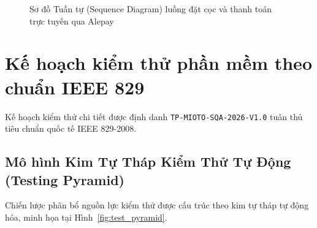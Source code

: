 \documentclass[12pt,a4paper,oneside]{report}
\begin{document}
\begin{figure}[ht]
{
  }
  \caption{Sơ đồ Tuần tự (Sequence Diagram) luồng đặt cọc và thanh toán trực tuyến qua Alepay}
  \label{fig:seq_booking_payment}
\end{figure}

\chapter{Kế hoạch kiểm thử phần mềm theo chuẩn IEEE 829}

Kế hoạch kiểm thử chi tiết được định danh \texttt{TP-MIOTO-SQA-2026-V1.0} tuân thủ tiêu chuẩn quốc tế IEEE 829-2008.

\section{Mô hình Kim Tự Tháp Kiểm Thử Tự Động (Testing Pyramid)}
Chiến lược phân bổ nguồn lực kiểm thử được cấu trúc theo kim tự tháp tự động hóa, minh họa tại Hình~\ref{fig:test_pyramid}.
\end{document}
